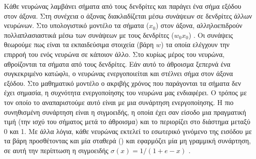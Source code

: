 Κάθε νευρώνας λαμβάνει σήματα από τους δενδρίτες και παράγει ένα σήμα εξόδου στον άξονα. Στη συνέχεια ο άξονας διακλαδίζεται μέσω συνάψεων σε δενδρίτες άλλων νευρώνων. Στο υπολογιστικό μοντέλο τα σήματα ($x_0$) στον άξονα, αλληλοεπιδρούν πολλαπλασιαστικά μέσω των συνάψεων με τους δενδρίτες ($w_0 x_0$) . Οι συνάψεις θεωρούμε πως είναι τα εκπαιδεύσιμα  στοιχεία (βάρη $w$)  τα οποία ελέγχουν την επιρροή του ενός νευρώνα σε κάποιον άλλο. Στο κυρίως μέρος του νευρώνα, αθροίζονται τα σήματα από τους δενδρίτες. Εάν αυτό το άθροισμα ξεπερνά ένα συγκεκριμένο κατώφλι, ο νευρώνας ενεργοποιείται και στέλνει σήμα στον άξονα εξόδου. Στο μαθηματικό μοντέλο ο ακριβής χρόνος που παράγονται τα σήματα δεν έχει σημασία, η συχνότητα ενεργοποίησης του νευρώνα μας ενδιαφέρει. Ο τρόπος με τον οποίο το αναπαριστούμε  αυτό είναι με μια συνάρτηση ενεργοποίησης. Η πιο συνηθισμένη συνάρτηση είναι η σιγμοειδής, η οποία έχει σαν είσοδο μια πραγματική τιμή (την ισχύ του σήματος μετά το άθροισμα) και το περιορίζει στο διάστημα μεταξύ 0 και 1. Με άλλα λόγια, κάθε νευρώνας εκτελεί το εσωτερικό γινόμενο της εισόδου με τα βάρη προσθέτοντας και μία σταθερά () και εφαρμόζει μία μη γραμμική συνάρτηση, σε αυτή την περίπτωση η σιγμοειδής  $\sigma(x)=1/(1+e-x)$ .

